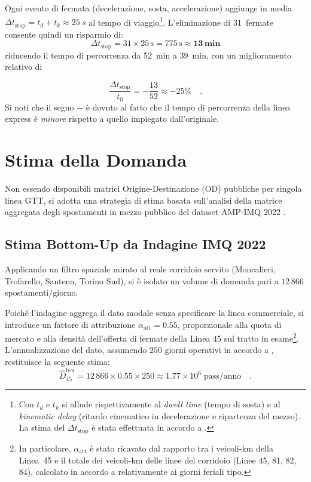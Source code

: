 \documentclass[conference]{IEEEtran}
\begin{document}
Ogni evento di fermata (decelerazione, sosta, accelerazione) aggiunge
in media $\Delta t_\text{stop} = t_d + t_k \approx \SI{25}{s}$ al tempo di viaggio\footnote{Con $t_d$ e $t_k$ si allude rispettivamente al \emph{dwell time} (tempo di sosta) e al \emph{kinematic delay} (ritardo cinematico in decelerazione e ripartenza del mezzo). La stima del $\Delta t_\text{stop}$ è stata effettuata in accordo a \cite{TRB2013}.}. L'eliminazione di 31~fermate consente quindi un risparmio di:
\begin{equation}
  \Delta t_\text{stop} = 31 \times 25\,\text{s} = 775\,\text{s}
  \approx \mathbf{13\,\text{min}}
  \label{eq:time_saving}
\end{equation}
riducendo il tempo di percorrenza da \SI{52}{min} a \SI{39}{min},
con un miglioramento relativo di

\begin{equation}
  \frac{\Delta t_\text{stop}}{t_0} = -\frac{13}{52} \approx -25\% \quad.
  \label{eq:pct_time}
\end{equation}
Si noti che il segno $-$ è dovuto al fatto che il tempo di percorrenza della linea express è \emph{minore} rispetto a quello impiegato dall'originale.

\section{Stima della Domanda}
\label{sec:ridership}

Non essendo disponibili matrici Origine-Destinazione (OD) pubbliche per singola linea GTT, si adotta una strategia di stima basata sull'analisi della matrice aggregata degli spostamenti in mezzo pubblico del dataset AMP-IMQ 2022 \cite{amp_imq2022}.

\subsection{Stima Bottom-Up da Indagine IMQ 2022}
Applicando un filtro spaziale mirato al reale corridoio servito (Moncalieri, Trofarello, Santena, Torino Sud), si è isolato un volume di domanda pari a $12\,866$ spostamenti/giorno.

Poiché l'indagine aggrega il dato modale senza specificare la linea commerciale, si introduce un fattore di attribuzione $\alpha_\text{att} = 0.55$, proporzionale alla quota di mercato e alla densità dell'offerta di fermate della Linea 45 sul tratto in esame\footnote{In particolare, $\alpha_\text{att}$ è stato ricavato dal rapporto tra i veicoli-km della Linea~45 e il totale dei veicoli-km delle linee del corridoio (Linee 45, 81, 82, 84), calcolato in accordo a \cite{gtt_gtfs} relativamente ai giorni feriali tipo.}. L'annualizzazione del dato, assumendo $250$ giorni operativi in accordo a \cite{gtt_gtfs}, restituisce la seguente stima:
\begin{equation}
  \hat{D}_{45}^\text{b-u} = 12\,866 \times 0.55 \times 250 \approx 1.77 \times 10^6 \;\text{pass/anno} \quad.
  \label{eq:ridership}
\end{equation}
\end{document}
